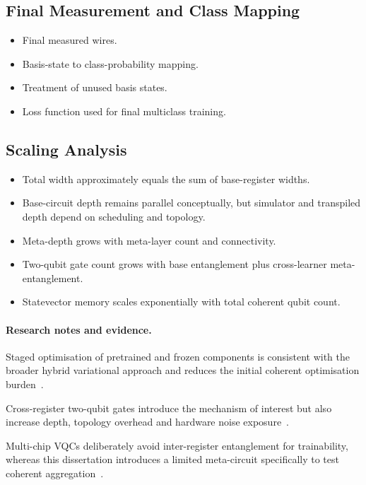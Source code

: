 \documentclass[]{UCD_CS_MSc_AAI_Report}
\newcommand{\challenge}[1]{{\color{red}#1}}
\newcommand{\method}[1]{{\color{cyan!80!black}#1}}
\newcommand{\comparison}[1]{{\color{pink!70!violet}#1}}
\newcommand{\researchnotes}{\paragraph{Research notes and evidence.}}
\begin{document}
\subsection{Final Measurement and Class Mapping}
\begin{itemize}
    \item Final measured wires.
    \item Basis-state to class-probability mapping.
    \item Treatment of unused basis states.
    \item Loss function used for final multiclass training.
\end{itemize}

\subsection{Scaling Analysis}
\begin{itemize}
    \item Total width approximately equals the sum of base-register widths.
    \item Base-circuit depth remains parallel conceptually, but simulator and transpiled depth depend on scheduling and topology.
    \item Meta-depth grows with meta-layer count and connectivity.
    \item Two-qubit gate count grows with base entanglement plus cross-learner meta-entanglement.
    \item Statevector memory scales exponentially with total coherent qubit count.
\end{itemize}

\researchnotes
\begin{itemize}
    \method{\item Staged optimisation of pretrained and frozen components is consistent with the broader hybrid variational approach and reduces the initial coherent optimisation burden~\cite{resch_quantum_2019,du_quantum_2025}.}
    \challenge{\item Cross-register two-qubit gates introduce the mechanism of interest but also increase depth, topology overhead and hardware noise exposure~\cite{resch_quantum_2019}.}
    \comparison{\item Multi-chip VQCs deliberately avoid inter-register entanglement for trainability, whereas this dissertation introduces a limited meta-circuit specifically to test coherent aggregation~\cite{park_addressing_2025}.}
\end{itemize}
\end{document}
